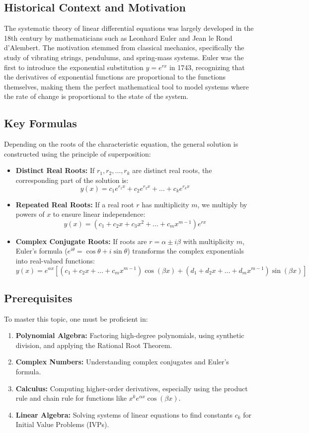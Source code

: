 \documentclass[11pt, a4paper]{article}
\theoremstyle{definition}
\theoremstyle{remark}
\begin{document}
\subsection{Historical Context and Motivation}
The systematic theory of linear differential equations was largely developed in the 18th century by mathematicians such as Leonhard Euler and Jean le Rond d'Alembert. The motivation stemmed from classical mechanics, specifically the study of vibrating strings, pendulums, and spring-mass systems. Euler was the first to introduce the exponential substitution $y = e^{rx}$ in 1743, recognizing that the derivatives of exponential functions are proportional to the functions themselves, making them the perfect mathematical tool to model systems where the rate of change is proportional to the state of the system.

\subsection{Key Formulas}
Depending on the roots of the characteristic equation, the general solution is constructed using the principle of superposition:
\begin{itemize}
    \item \textbf{Distinct Real Roots:} If $r_1, r_2, \dots, r_k$ are distinct real roots, the corresponding part of the solution is:
    \[ y(x) = c_1 e^{r_1 x} + c_2 e^{r_2 x} + \dots + c_k e^{r_k x} \]
    \item \textbf{Repeated Real Roots:} If a real root $r$ has multiplicity $m$, we multiply by powers of $x$ to ensure linear independence:
    \[ y(x) = (c_1 + c_2 x + c_3 x^2 + \dots + c_m x^{m-1}) e^{rx} \]
    \item \textbf{Complex Conjugate Roots:} If roots are $r = \alpha \pm i\beta$ with multiplicity $m$, Euler's formula ($e^{i\theta} = \cos\theta + i\sin\theta$) transforms the complex exponentials into real-valued functions:
    \[ y(x) = e^{\alpha x} \left[ (c_1 + c_2 x + \dots + c_m x^{m-1})\cos(\beta x) + (d_1 + d_2 x + \dots + d_m x^{m-1})\sin(\beta x) \right] \]
\end{itemize}

\subsection{Prerequisites}
To master this topic, one must be proficient in:
\begin{enumerate}
    \item \textbf{Polynomial Algebra:} Factoring high-degree polynomials, using synthetic division, and applying the Rational Root Theorem.
    \item \textbf{Complex Numbers:} Understanding complex conjugates and Euler's formula.
    \item \textbf{Calculus:} Computing higher-order derivatives, especially using the product rule and chain rule for functions like $x^k e^{\alpha x} \cos(\beta x)$.
    \item \textbf{Linear Algebra:} Solving systems of linear equations to find constants $c_k$ for Initial Value Problems (IVPs).
\end{enumerate}
\end{document}
